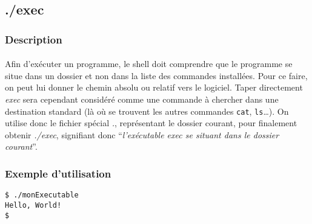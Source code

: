 \subsection{./exec}

\subsubsection*{Description}

\paragraph{} Afin d'exécuter un programme, le shell doit comprendre que le
programme se situe dans un dossier et non dans la liste des commandes
installées.  Pour ce faire, on peut lui donner le chemin absolu ou relatif vers
le logiciel. Taper directement \emph{exec} sera cependant considéré comme une
commande à chercher dans une destination standard (là où se trouvent les autres
commandes \texttt{cat}, \texttt{ls}\ldots).  On utilise donc le fichier spécial
\emph{.}, représentant le dossier courant, pour finalement obtenir
\emph{./exec}, signifiant donc ``\emph{l'exécutable exec se situant dans le
	dossier courant}''.

\subsubsection*{Exemple d'utilisation}
\begin{lstlisting}
$ ./monExecutable
Hello, World!
$ 
\end{lstlisting}
